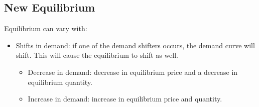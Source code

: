 \documentclass[nobib]{tufte-handout}
\begin{document}
\subsection{New Equilibrium}
Equilibrium can vary with:
\begin{itemize}
    \item Shifts in demand: if one of the demand shifters occurs, the demand curve will
          shift. This will cause the equilibrium to shift as well.
          \begin{itemize}
              \item Decrease in demand: decrease in equilibrium price and a decrease in equilibrium
                    quantity.
                    \begin{center}
                    \end{center}
              \item Increase in demand: increase in equilibrium price and quantity.
                    \begin{center}

\end{center}
\end{itemize}
\end{itemize}
\end{document}
